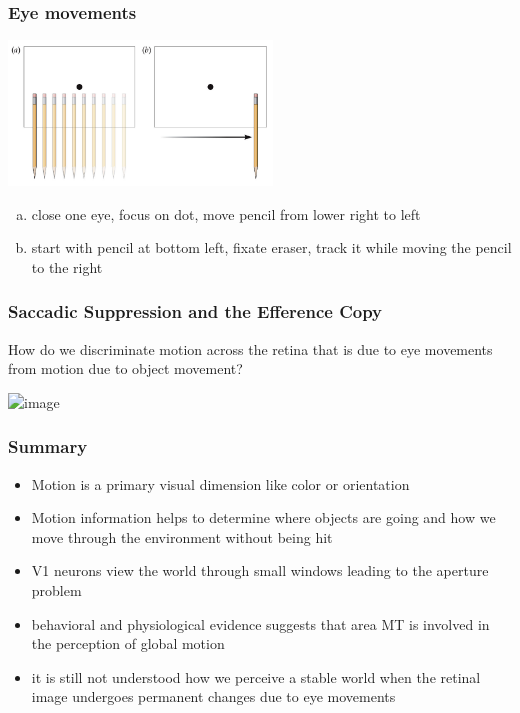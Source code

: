 \documentclass[]{beamer}
\begin{document}
\begin{frame}
 \frametitle{Eye movements}
\begin{overlayarea}{110mm}{80mm}
\begin{center}
\includegraphics[width=70mm]{figs/l7/eye_movement_demo.png} 
\end{center}
\begin{enumerate}[(a)]
 \item close one eye, focus on dot, move pencil from lower right to left
 \item start with pencil at bottom left, fixate eraser, track it while moving the pencil to the right
\end{enumerate}

\end{overlayarea}
\end{frame}


\begin{frame}
\frametitle{Saccadic Suppression and the Efference Copy}
\begin{overlayarea}{120mm}{80mm}
 How do we discriminate motion across the retina that is due to eye movements from motion due to object movement?\\ \vspace{2mm}
 \begin{center}
\includegraphics<2->[width=70mm]{figs/l7/efference_copy.png} 
\end{center}
 
\end{overlayarea}
\end{frame}


\begin{frame}
 \frametitle{Summary}
\begin{itemize}
\setlength{\itemsep}{5pt}
 \item Motion is a primary visual dimension like color or orientation
 \item Motion information helps to determine where objects are going and how we move through the environment without being hit
 \item V1 neurons view the world through small windows leading to the aperture problem
 \item behavioral and physiological evidence suggests that area MT is involved in the perception of global motion
 \item it is still not understood how we perceive a stable world when the retinal image undergoes permanent changes due to eye movements
\end{itemize}
\end{frame}
\end{document}
